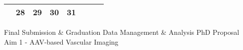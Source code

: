 {\begin{tabularx}{\linewidth}{|l!{\vrule width \myLenLineThicknessThick}*{7}{@{}X@{}|}}
       & 
    
      
      
        \begin{minipage}[t]{6mm}\centering{}28\end{minipage}
      
       & 
    
      
      
        \begin{minipage}[t]{6mm}\centering{}29\end{minipage}
      
       & 
    
      
      
        \begin{minipage}[t]{6mm}\centering{}30\end{minipage}
      
       & 
    
      
      
        \begin{minipage}[t]{6mm}\centering{}31\end{minipage}
      
       & 
    
      
      
      
        \\  \hline 
      
    
  
  
  \end{tabularx}
}
\vfill{\centering{} \small{Final Submission \& Graduation}\hspace{1.5em} \small{Data Management \& Analysis}\hspace{1.5em} \small{PhD Proposal}\hspace{1.5em} \small{Aim 1 - AAV-based Vascular Imaging}\hspace{1.5em}\par}

